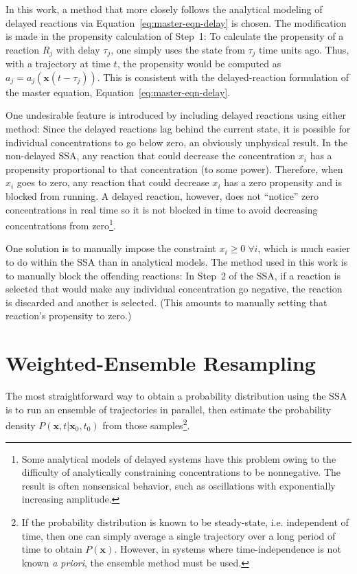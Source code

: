 \documentclass[english,letterpaper,12pt]{report}
\renewcommand{\vec}[1]{\ensuremath{\mathbf{#1}}}
\newcommand{\delaytime}{\ensuremath{\tau}}
\begin{document}
\begin{doublespacing}
In this work, a method that more closely follows the analytical modeling of delayed reactions via Equation~\eqref{eq:master-eqn-delay} is chosen. The modification is made in the propensity calculation of Step~1: To calculate the propensity of a reaction $R_j$ with delay $\delaytime_j$, one simply uses the state from $\delaytime_j$ time units ago. Thus, with a trajectory at time $t$, the propensity would be computed as $a_j = a_j\left(\vec{x}(t - \delaytime_j)\right)$. This is consistent with the delayed-reaction formulation of the master equation, Equation~\eqref{eq:master-eqn-delay}.

One undesirable feature is introduced by including delayed reactions using either method: Since the delayed reactions lag behind the current state, it is possible for individual concentrations to go below zero, an obviously unphysical result. In the non-delayed SSA, any reaction that could decrease the concentration $x_i$ has a propensity proportional to that concentration (to some power). Therefore, when $x_i$ goes to zero, any reaction that could decrease $x_i$ has a zero propensity and is blocked from running. A delayed reaction, however, does not ``notice'' zero concentrations in real time so it is not blocked in time to avoid decreasing concentrations from zero\footnote{Some analytical models of delayed systems have this problem owing to the difficulty of analytically constraining concentrations to be nonnegative. The result is often nonsensical behavior, such as oscillations with exponentially increasing amplitude.}.

One solution is to manually impose the constraint $x_i \geq 0\; \forall i$, which is much easier to do within the SSA than in analytical models. The method used in this work is to manually block the offending reactions: In Step~2 of the SSA, if a reaction is selected that would make any individual concentration go negative, the reaction is discarded and another is selected. (This amounts to manually setting that reaction's propensity to zero.) 


\section{Weighted-Ensemble Resampling} %
\label{sub:we-resampling-intro}

The most straightforward way to obtain a probability distribution using the SSA is to run an ensemble of trajectories in parallel, then estimate the probability density $P(\vec{x}, t | \vec{x}_0, t_0)$ from those samples\footnote{If the probability distribution is known to be steady-state, i.e. independent of time, then one can simply average a single trajectory over a long period of time to obtain $P(\vec{x})$. However, in systems where time-independence is not known \textit{a priori}, the ensemble method must be used.}.


\end{doublespacing}
\end{document}
